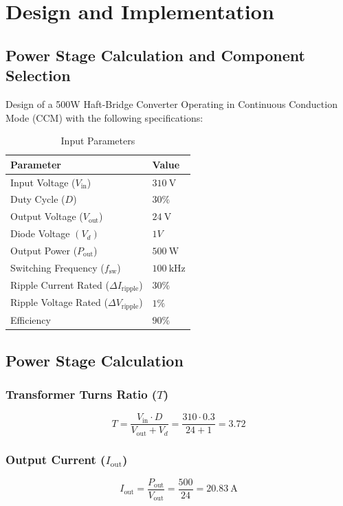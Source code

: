 \section{Design and Implementation}
\subsection{Power Stage Calculation and Component Selection}
Design of a 500W Haft-Bridge Converter Operating in Continuous Conduction Mode (CCM) with
the following specifications:
\begin{table}[h!]
    \centering
    \begin{tabular}{ll}
        \toprule
        \textbf{Parameter} & \textbf{Value} \\
        \midrule
        Input Voltage ($V_{\text{in}}$) & $\SI{310}{\volt}$ \\
        Duty Cycle ($D$) & $30\% $ \\
        Output Voltage ($V_{\text{out}}$) & $\SI{24}{\volt}$ \\
        Diode Voltage $(V_d)$ & $1V$\\
        Output Power ($P_{\text{out}}$) & $\SI{500}{\watt}$ \\
        Switching Frequency ($f_{\text{sw}}$) & $\SI{100}{\kilo\hertz}$ \\
        Ripple Current Rated ($\Delta I_{\text{ripple}}$) & $30\%$ \\
        Ripple Voltage Rated ($\Delta V_{\text{ripple}}$) & $1\%$ \\
        Efficiency & $90\%$ \\
        \bottomrule
    \end{tabular}
    \caption{Input Parameters}
    \label{tab:system_parameters}
\end{table}
\subsection{Power Stage Calculation}

\subsubsection*{Transformer Turns Ratio (\(T\))}
\begin{equation}
T = \frac{V_{\text{in}} \cdot D}{V_{\text{out}} + V_d} = \frac{310 \cdot 0.3}{24 + 1} = \boxed{3.72}
\end{equation}

\subsubsection*{Output Current (\(I_{\text{out}}\))}
\begin{equation}
I_{\text{out}} = \frac{P_{\text{out}}}{V_{\text{out}}} = \frac{500}{24} = \boxed{\SI{20.83}{\ampere}}
\end{equation}

